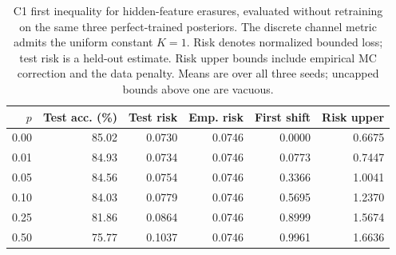 \begin{table}[t]
\centering\footnotesize
\caption{C1 first inequality for hidden-feature erasures, evaluated without retraining on the same three perfect-trained posteriors. The discrete channel metric admits the uniform constant $K=1$. Risk denotes normalized bounded loss; test risk is a held-out estimate. Risk upper bounds include empirical MC correction and the data penalty. Means are over all three seeds; uncapped bounds above one are vacuous.}
\label{tab:c1_erasure}
\begin{tabular}{rrrrrr}
\toprule
$p$ & Test acc. (\%) & Test risk & Emp. risk & First shift & Risk upper\\
\midrule
0.00 & 85.02 & 0.0730 & 0.0746 & 0.0000 & 0.6675\\
0.01 & 84.93 & 0.0734 & 0.0746 & 0.0773 & 0.7447\\
0.05 & 84.56 & 0.0754 & 0.0746 & 0.3366 & 1.0041\\
0.10 & 84.03 & 0.0779 & 0.0746 & 0.5695 & 1.2370\\
0.25 & 81.86 & 0.0864 & 0.0746 & 0.8999 & 1.5674\\
0.50 & 75.77 & 0.1037 & 0.0746 & 0.9961 & 1.6636\\
\bottomrule
\end{tabular}
\end{table}
